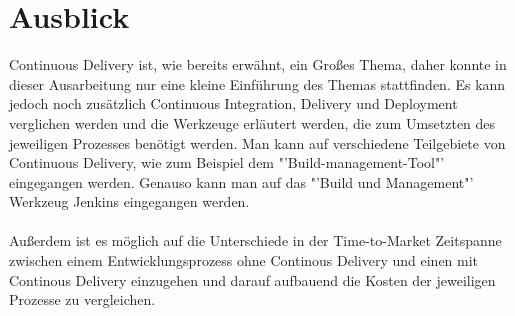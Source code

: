 \section{Ausblick}
\label{sec:ausblick}
Continuous Delivery ist, wie bereits erwähnt, ein Großes Thema, daher konnte in dieser Ausarbeitung nur eine kleine Einführung des Themas stattfinden. Es kann jedoch noch zusätzlich Continuous Integration, Delivery und Deployment verglichen werden und die Werkzeuge erläutert werden, die zum Umsetzten des jeweiligen Prozesses benötigt werden. Man kann auf verschiedene Teilgebiete von Continuous Delivery, wie zum Beispiel dem "'Build-management-Tool"' eingegangen werden. Genauso kann man auf das "'Build und Management"' Werkzeug Jenkins eingegangen werden.
\\\\
Außerdem ist es möglich auf die Unterschiede in der Time-to-Market Zeitspanne zwischen einem Entwicklungsprozess ohne Continous Delivery und einen mit Continous Delivery einzugehen und darauf aufbauend die Kosten der jeweiligen Prozesse zu vergleichen.